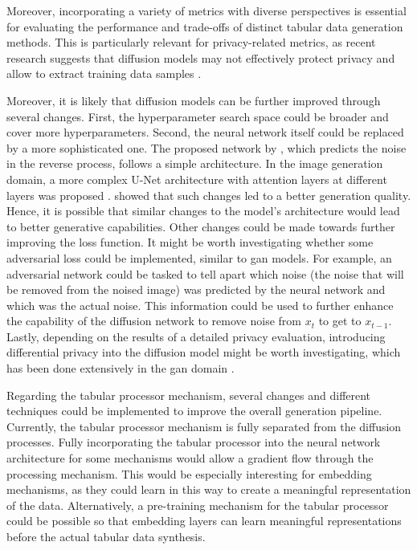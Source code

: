 Moreover, incorporating a variety of metrics with diverse perspectives is essential for evaluating the performance and trade-offs of distinct tabular data generation methods.
This is particularly relevant for privacy-related metrics, as recent research suggests that diffusion models may not effectively protect privacy and allow to extract training data samples \cite{carlini2023ExtractingTrainingData}.

Moreover, it is likely that diffusion models can be further improved through several changes.
First, the hyperparameter search space could be broader and cover more hyperparameters.
Second, the neural network itself could be replaced by a more sophisticated one.
The proposed network by \cite{kotelnikov2022TabDDPMModellingTabular}, which predicts the noise in the reverse process, follows a simple architecture.
In the image generation domain, a more complex U-Net \cite{ronneberger2015UNetConvolutionalNetworks} architecture with attention layers at different layers was proposed \cite{dhariwal2021DiffusionModelsBeat}.
\cite{dhariwal2021DiffusionModelsBeat} showed that such changes led to a better generation quality.
Hence, it is possible that similar changes to the model's architecture would lead to better generative capabilities.
Other changes could be made towards further improving the loss function.
It might be worth investigating whether some adversarial loss could be implemented, similar to \gls{gan} models.
For example, an adversarial network could be tasked to tell apart which noise (the noise that will be removed from the noised image) was predicted by the neural network and which was the actual noise.
This information could be used to further enhance the capability of the diffusion network to remove noise from $x_{t}$ to get to $x_{t-1}$.
Lastly, depending on the results of a detailed privacy evaluation, introducing differential privacy \cite{dwork2011DifferentialPrivacy} into the diffusion model might be worth investigating, which has been done extensively in the \gls{gan} domain \cite{jordon2018PATEGANGeneratingSynthetic,9054559, kunar2021DTGANDifferentialPrivatea, torfi2022DifferentiallyPrivateSynthetic}.

Regarding the tabular processor mechanism, several changes and different techniques could be implemented to improve the overall generation pipeline.
Currently, the tabular processor mechanism is fully separated from the diffusion processes.
Fully incorporating the tabular processor into the neural network architecture for some mechanisms would allow a gradient flow through the processing mechanism.
This would be especially interesting for embedding mechanisms, as they could learn in this way to create a meaningful representation of the data.
Alternatively, a pre-training mechanism for the tabular processor could be possible so that embedding layers can learn meaningful representations before the actual tabular data synthesis.

